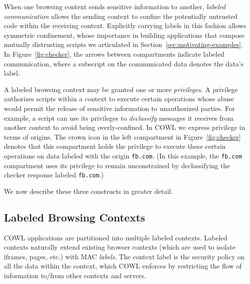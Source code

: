 When one browsing context sends sensitive information to
  another, {\em labeled communication} allows the sending context to
  confine the potentially untrusted code within the receiving
  context. Explicitly carrying labels in this fashion allows symmetric
  confinement, whose importance in building applications that compose
  mutually distrusting scripts we articulated in
  Section~\ref{sec:motivating-examples}. In Figure~\ref{fig:checker},
  the arrows between compartments indicate labeled communication,
  where a subscript on the communicated data denotes the data's label.

  A labeled browsing context may be granted one or more {\em
    privileges.} A privilege authorizes scripts within a context to
  execute certain operations whose abuse would permit the release of
  sensitive information to unauthorized parties. For example, a script
  can use its privileges to {\em declassify} messages it receives from
  another context to avoid being overly-confined. In COWL we express
  privilege in terms of origins. The crown icon in the left
  compartment in Figure~\ref{fig:checker} denotes that this
  compartment holds the privilege to execute these certain operations
  on data labeled with the origin {\tt fb.com}. (In this example, the
  {\tt fb.com} compartment uses its privilege to remain unconstrained
  by declassifying the checker response labeled {\tt fb.com}.)


We now describe these three constructs in greater detail.



\subsection{Labeled Browsing Contexts}
\label{sec:system:contexts}
COWL applications are partitioned into multiple labeled contexts.
%
Labeled contexts naturally extend existing browser contexts (which
are used to isolate iframes, pages, etc.) with MAC \emph{labels}.
%
The context label is the security policy on all the data within the
context, which COWL enforces by restricting the flow of information
to/from other contexts and servers.

